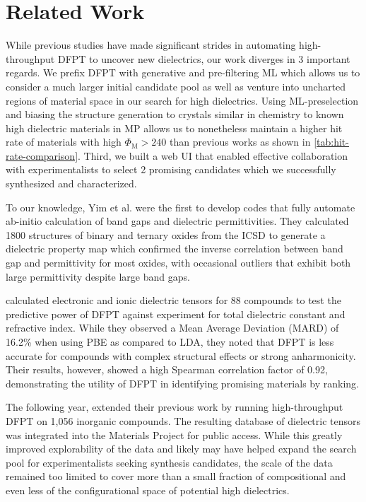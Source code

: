 \documentclass{article}
\newcommand{\fom}[1][]{\Phi_\text{M#1}}
\begin{document}
\section{Related Work}
\label{sec:related-work}

While previous studies have made significant strides in automating high-throughput DFPT to uncover new dielectrics, our work diverges in 3 important regards.
We prefix DFPT with generative and pre-filtering ML which allows us to consider a much larger initial candidate pool as well as venture into uncharted regions of material space in our search for high dielectrics.
Using ML-preselection and biasing the structure generation to crystals similar in chemistry to known high dielectric materials in MP allows us to nonetheless maintain a higher hit rate of materials with high $\fom > 240$ than previous works as shown in \cref{tab:hit-rate-comparison}.
Third, we built a web UI that enabled effective collaboration with experimentalists to select 2 promising candidates which we successfully synthesized and characterized.


To our knowledge, Yim et al. \cite{yim_novel_2015} were the first to develop codes that fully automate ab-initio calculation of band gaps and dielectric permittivities.
They calculated 1800 structures of binary and ternary oxides from the ICSD to generate a dielectric property map which confirmed the inverse correlation between band gap and permittivity for most oxides, with occasional outliers that exhibit both large permittivity despite large band gaps.

\citeauthor*{petousis_benchmarking_2016} \cite{petousis_benchmarking_2016} calculated electronic and ionic dielectric tensors for 88 compounds to test the predictive power of DFPT against experiment for total dielectric constant and refractive index.
While they observed a Mean Average Deviation (MARD) of 16.2\% when using PBE as compared to LDA, they noted that DFPT is less accurate for compounds with complex structural effects or strong anharmonicity.
Their results, however, showed a high Spearman correlation factor of 0.92, demonstrating the utility of DFPT in identifying promising materials by ranking.

The following year, \citeauthor*{petousis_benchmarking_2016}\cite{petousis_high-throughput_2017} extended their previous work by running high-throughput DFPT on 1,056 inorganic compounds.
The resulting database of dielectric tensors was integrated into the Materials Project for public access.
While this greatly improved explorability of the data and likely may have helped expand the search pool for experimentalists seeking synthesis candidates, the scale of the data remained too limited to cover more than a small fraction of compositional and even less of the configurational space of potential high dielectrics.
\end{document}

